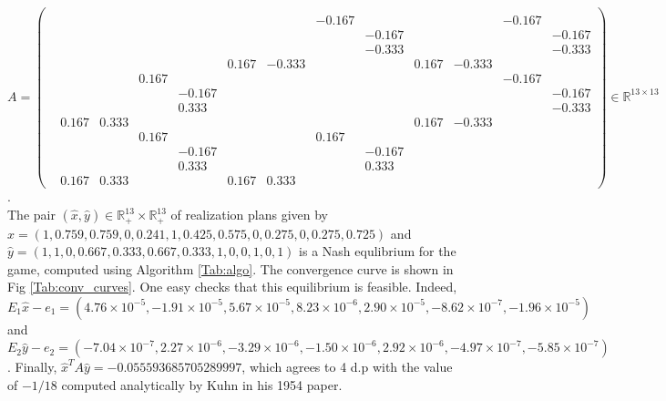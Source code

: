 \documentclass[a4paper,9pt,journal]{IEEEtran}
\begin{document}
$A = \left(\begin{array}{ccccccccccccc}
  &   &   &   &   &   &   &   &   &   &   &   &  \\
  &   &   &   &   &   &   & -0.167 &   &   &   & -0.167 &  \\
  &   &   &   &   &   &   &   & -0.167 &   &   &   & -0.167\\
  &   &   &   &   &   &   &   & -0.333 &   &   &   & -0.333\\
  &   &   &   &   & 0.167 & -0.333 &   &   & 0.167 & -0.333 &   &  \\
  &   &   & 0.167 &   &   &   &   &   &   &   & -0.167 &  \\
  &   &   &   & -0.167 &   &   &   &   &   &   &   & -0.167\\
  &   &   &   & 0.333 &   &   &   &   &   &   &   & -0.333\\
  & 0.167 & 0.333 &   &   &   &   &   &   & 0.167 & -0.333 &   &  \\
  &   &   & 0.167 &   &   &   & 0.167 &   &   &   &   &  \\
  &   &   &   & -0.167 &   &   &   & -0.167 &   &   &   &  \\
  &   &   &   & 0.333 &   &   &   & 0.333 &   &   &   &  \\
  & 0.167 & 0.333 &   &   & 0.167 & 0.333 &   &   &   &   &   &  
\end{array}\right)
 \in \mathbb{R}^{13 \times 13}$.\\
The pair $(\hat{x}, \hat{y}) \in \mathbb{R}^{13}_+ \times \mathbb{R}^{13}_+$ of realization plans given by $\hat{x} = (1, 0.759, 0.759, 0, 0.241, 1, 0.425, 0.575, 0, 0.275, 0, 0.275, 0.725)$ and\\
$\hat{y} = (1, 1, 0, 0.667, 0.333, 0.667, 0.333, 1, 0, 0, 1, 0, 1)$ is a Nash equlibrium for the game, computed using Algorithm  \ref{Tab:algo}. The convergence curve is shown in Fig \ref{Tab:conv_curves}. One easy checks that this equilibrium is feasible. Indeed,  $E_1\hat{x} - e_1 = (4.76 \times 10^{-5}, -1.91 \times 10^{-5}, 5.67 \times 10^{-5}, 8.23 \times 10^{-6}, 2.90 \times 10^{-5}, -8.62 \times 10^{-7}, -1.96 \times 10^{-5})$ and $E_2\hat{y} - e_2 = (-7.04 \times 10^{-7}, 2.27 \times 10^{-6}, -3.29 \times 10^{-6}, -1.50 \times 10^{-6}, 2.92 \times 10^{-6}, -4.97 \times 10^{-7}, -5.85 \times 10^{-7})$. Finally, $\hat{x}^TA\hat{y} = -0.055593685705289997$, which agrees to 4 d.p with the value of $-1 / 18$ computed analytically by Kuhn in his 1954 paper.
\end{document}
